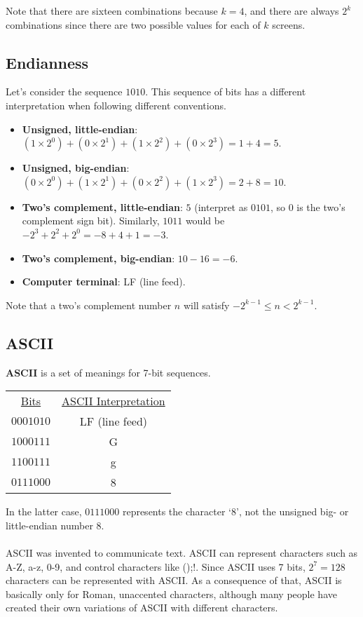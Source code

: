 \documentclass[]{article}
\theoremstyle{definition}
\begin{document}
		Note that there are sixteen combinations because $k = 4$, and there are always $2^k$ combinations since there are two possible values for each of $k$ screens.
	
		\subsection{Endianness}
			Let's consider the sequence $1010$. This sequence of bits has a different interpretation when following different conventions.
			\begin{itemize}
				\item \textbf{Unsigned, little-endian}: $(1 \times 2^0) + (0 \times 2^1) + (1 \times 2^2) + (0 \times 2^3) = 1 + 4 = 5$.
				\item \textbf{Unsigned, big-endian}: $(0 \times 2^0) + (1 \times 2^1) + (0 \times 2^2) + (1 \times 2^3) = 2 + 8 = 10$.
				\item \textbf{Two's complement, little-endian}: $5$ (interpret as $0101$, so 0 is the two's complement sign bit). Similarly, $1011$ would be $-2^3 + 2^2 + 2^0 = -8 + 4 + 1 = -3$.
				\item \textbf{Two's complement, big-endian}: $10 - 16 = -6$.
				\item \textbf{Computer terminal}: LF (line feed).
			\end{itemize}
	
			Note that a two's complement number $n$ will satisfy $-2^{k-1} \le n < 2^{k-1}$.
	
		\subsection{ASCII}
	
			\textbf{ASCII} is a set of meanings for 7-bit sequences.
		
			\begin{center}
				\begin{tabular}{cc}
					\underline{Bits} & \underline{ASCII Interpretation} \\
					$0001010$ & LF (line feed) \\
					$1000111$ & G \\
					$1100111$ & g \\
					$0111000$ & 8
				\end{tabular}
			\end{center}
			
			In the latter case, $0111000$ represents the character `$8$', not the unsigned big- or little-endian number $8$. \\ \\
			ASCII was invented to communicate text. ASCII can represent characters such as A-Z, a-z, 0-9, and control characters like ();!. Since ASCII uses 7 bits, $2^7 = 128$ characters can be represented with ASCII. As a consequence of that, ASCII is basically only for Roman, unaccented characters, although many people have created their own variations of ASCII with different characters.
	
\end{document}
